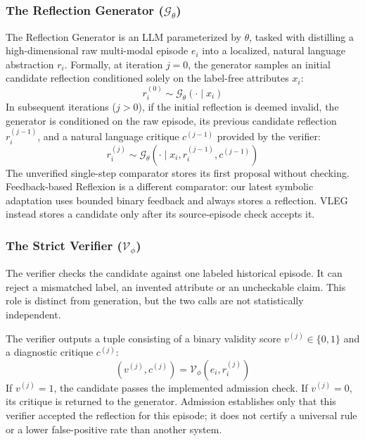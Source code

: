 \documentclass[onecolumn]{IEEEtran}
\numberwithin{equation}{section}
\theoremstyle{definition}
\theoremstyle{remark}
\begin{document}
\subsubsection{The Reflection Generator ($\mathcal{G}_\theta$)}

The Reflection Generator is an LLM parameterized by $\theta$, tasked with distilling a high-dimensional raw multi-modal episode $e_i$ into a localized, natural language abstraction $r_i$. Formally, at iteration $j=0$, the generator samples an initial candidate reflection conditioned solely on the label-free attributes $x_i$:
\begin{equation}
    r_i^{(0)} \sim \mathcal{G}_\theta(\cdot \mid x_i)
\end{equation}
In subsequent iterations ($j > 0$), if the initial reflection is deemed invalid, the generator is conditioned on the raw episode, its previous candidate reflection $r_i^{(j-1)}$, and a natural language critique $c^{(j-1)}$ provided by the verifier:
\begin{equation}
    r_i^{(j)} \sim \mathcal{G}_\theta(\cdot \mid x_i, r_i^{(j-1)}, c^{(j-1)})
\end{equation}
The unverified single-step comparator stores its first proposal without checking. Feedback-based Reflexion \cite{shinn2023reflexion} is a different comparator: our latest symbolic adaptation uses bounded binary feedback and always stores a reflection. VLEG instead stores a candidate only after its source-episode check accepts it.

\subsubsection{The Strict Verifier ($\mathcal{V}_\phi$)}

The verifier checks the candidate against one labeled historical episode. It can reject a mismatched label, an invented attribute or an uncheckable claim. This role is distinct from generation, but the two calls are not statistically independent.

The verifier outputs a tuple consisting of a binary validity score $v^{(j)} \in \{0, 1\}$ and a diagnostic critique $c^{(j)}$:
\begin{equation}
    (v^{(j)}, c^{(j)}) = \mathcal{V}_\phi(e_i, r_i^{(j)})
\end{equation}
If $v^{(j)}=1$, the candidate passes the implemented admission check. If $v^{(j)}=0$, its critique is returned to the generator. Admission establishes only that this verifier accepted the reflection for this episode; it does not certify a universal rule or a lower false-positive rate than another system.
\end{document}
